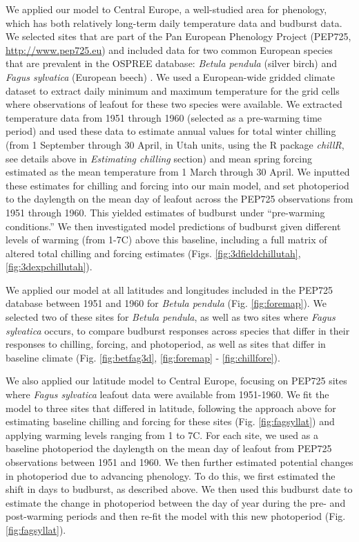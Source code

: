 \documentclass{article}
\begin{document}
\par We applied our model to Central Europe, a well-studied area for phenology, which has both relatively long-term daily temperature data and budburst data. We selected sites that are part of the Pan European Phenology Project (PEP725, \url{http://www.pep725.eu}) and included data for two common European species that are prevalent in the OSPREE database: \emph{Betula pendula} (silver birch) and \emph{Fagus sylvatica} (European beech) \emph{\citep{Templ2018}}. We used a European-wide gridded climate dataset \emph{\citep[{\normalfont E-OBS},][]{cornes2018}} to extract daily minimum and maximum temperature for the grid cells where observations of leafout for these two species were available. We extracted temperature data from 1951 through 1960 (selected as a pre-warming time period) and used these data to estimate annual values for total winter chilling (from 1 September through 30 April, in Utah units, using the R package \textit{chillR}, see details above in \emph{Estimating chilling} section) and mean spring forcing estimated as the mean temperature from 1 March through 30 April. We inputted these estimates for chilling and forcing into our main model, and set photoperiod to the daylength on the mean day of leafout across the PEP725 observations from 1951 through 1960. This yielded estimates of budburst under ``pre-warming conditions.'' We then investigated model predictions of budburst given different levels of warming (from 1-7\degree C) above this baseline, including a full matrix of altered total chilling and forcing estimates (Figs. \ref{fig:3dfieldchillutah},\ref{fig:3dexpchillutah}). 
\par We applied our model at all latitudes and longitudes included in the PEP725 database between 1951 and 1960 for \emph{Betula pendula} (Fig. \ref{fig:foremap}). We selected two of these sites for \emph{Betula pendula}, as well as two sites where \emph{Fagus sylvatica} occurs, to compare budburst responses across species that differ in their responses to chilling, forcing, and photoperiod, as well as sites that differ in baseline climate (Fig. \ref{fig:betfag3d}, \ref{fig:foremap} - \ref{fig:chillfore}).

\par We also applied our latitude model to Central Europe, focusing on PEP725 sites where \emph{Fagus sylvatica} leafout data were available from 1951-1960. We fit the model to three sites that differed in latitude, following the approach above for estimating baseline chilling and forcing for these sites (Fig. \ref{fig:fagsyllat}) and applying warming levels ranging from 1 to 7\degree C.   For each site, we used as a baseline photoperiod the daylength on the mean day of leafout from PEP725 observations between 1951 and 1960. We then further estimated potential changes in photoperiod due to advancing phenology. To do this, we first estimated the shift in days to budburst, as described above.
We then used this budburst date to estimate the change in photoperiod between the day of year during the pre- and post-warming periods and then re-fit the model with this new photoperiod (Fig. \ref{fig:fagsyllat}). 
\end{document}
